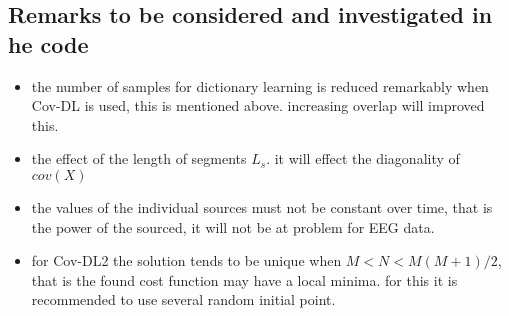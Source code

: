 \subsection{Remarks to be considered and investigated in he code}
\begin{itemize}
\item the number of samples for dictionary learning is reduced remarkably when Cov-DL is used, this is mentioned above. increasing overlap will improved this. 
\item the effect of the length of segments $L_s$. it will effect the diagonality of $cov(X)$
\item the values of the individual sources must not be constant over time, that is the power of the sourced, it will not be at problem for EEG data. 
\item for Cov-DL2 the solution tends to be unique when $M<N<M(M+1)/2$, that is the found cost function may have a local minima. for this it is recommended to use several random initial point.  
\end{itemize}


